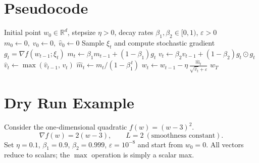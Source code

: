 \documentclass{article}
\newcommand{\R}{\mathbb{R}}
\begin{document}
\section*{Pseudocode}
\begin{algorithm}[H]
\caption{AMSGrad}
\begin{algorithmic}[1]
\REQUIRE Initial point $w_0\in\R^d$, stepsize $\eta>0$, decay rates $\beta_1,\beta_2\in[0,1)$, $\varepsilon>0$
\STATE $m_0\gets 0,\; v_0\gets 0,\; \hat v_0\gets 0$
    \STATE Sample $\xi_t$ and compute stochastic gradient $g_t=\nabla f(w_{t-1};\xi_t)$
    \STATE $m_t \gets \beta_1 m_{t-1} + (1-\beta_1) g_t$ \hfill{}
    \STATE $v_t \gets \beta_2 v_{t-1} + (1-\beta_2) g_t\odot g_t$ \hfill{}
    \STATE $\hat v_t \gets \max(\hat v_{t-1},\, v_t)$ \hfill{}
    \STATE $\hat m_t \gets m_t/(1-\beta_1^{\,t})$ \hfill{}
    \STATE $w_t \gets w_{t-1} - \eta\, \frac{\hat m_t}{\sqrt{\hat v_t}+\varepsilon}$ \hfill{}
\ENDFOR
\RETURN $w_T$
\end{algorithmic}
\end{algorithm}

\section*{Dry Run Example}
Consider the one‑dimensional quadratic $f(w)=(w-3)^2$.
\[
\nabla f(w)=2(w-3),\qquad L=2\ (\text{smoothness constant}).
\]
Set $\eta=0.1$, $\beta_1=0.9$, $\beta_2=0.999$, $\varepsilon=10^{-8}$ and start from $w_0=0$.
All vectors reduce to scalars; the $\max$ operation is simply a scalar max.
\end{document}
